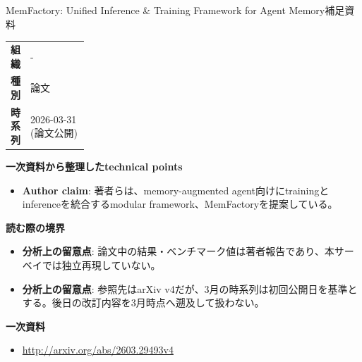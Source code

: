 \begin{technicalnote}{MemFactory: Unified Inference \& Training Framework for Agent Memory}{補足資料}
\begingroup
\begin{tabularx}{\linewidth}{@{}>{\bfseries}p{0.22\linewidth}X@{}}
組織 & - \\
種別 & 論文 \\
時系列 & 2026-03-31 (論文公開) \\
\end{tabularx}
\smallskip
{\bfseries 一次資料から整理したtechnical points}
\begin{itemize}[leftmargin=1.5em,itemsep=0.35em]
\item \textbf{Author claim}: 著者らは、memory-augmented agent向けにtrainingとinferenceを統合するmodular framework、MemFactoryを提案している。
\end{itemize}
\begin{minipage}{\linewidth}
{\bfseries 読む際の境界}
\begin{itemize}[leftmargin=1.5em,itemsep=0.35em]
\item \textbf{分析上の留意点}: 論文中の結果・ベンチマーク値は著者報告であり、本サーベイでは独立再現していない。
\item \textbf{分析上の留意点}: 参照先はarXiv v4だが、3月の時系列は初回公開日を基準とする。後日の改訂内容を3月時点へ遡及して扱わない。
\end{itemize}
\begin{samepage}
{\bfseries 一次資料}
\begingroup\sloppy
\begin{itemize}[leftmargin=1.5em,itemsep=0.25em]
\item {\scriptsize\url{http://arxiv.org/abs/2603.29493v4}}
\end{itemize}
\endgroup
\end{samepage}
\end{minipage}
\endgroup
\end{technicalnote}
\medskip
